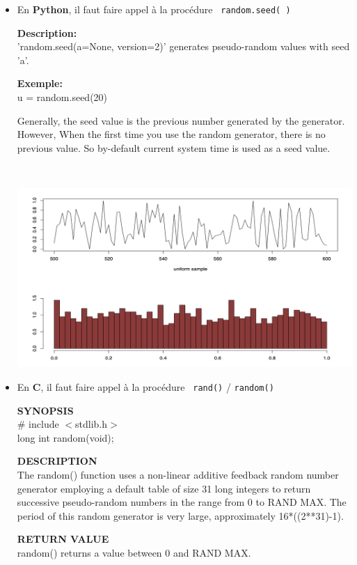 \begin{itemize}
\item En {\bf Python}, il faut faire appel \`a la proc\'edure 
\texttt{ random.seed( )} \\

{\footnotesize 
{\sffamily

{\bfseries Description:}\\
'random.seed(a=None, version=2)' generates pseudo-random values with seed 'a'.

{\bfseries Exemple:}\\
    u = random.seed(20)

Generally, the seed value is the previous number generated by the generator. However, When the first time you use the random generator, there is no previous value. So by-default current system time is used as a seed value.} }\\

\begin{center}
\includegraphics[scale=0.3]{figures/calcul/runif.png}
\end{center}


\item En {\bf C}, il faut faire appel \`a la proc\'edure \texttt{ rand()} / {\tt random()} \\

{\footnotesize 
{\sffamily

{\bfseries SYNOPSIS}\\
       \# include $<$stdlib.h$>$\\
       long int random(void);

{\bfseries DESCRIPTION}\\
The random() function uses a non-linear additive feedback 
random number generator employing a default table of size 
31 long integers to return successive pseudo-random numbers 
in the range from 0 to RAND MAX. The period of this random 
generator is very large, approximately 16*((2**31)-1).

{\bfseries RETURN VALUE}\\
random() returns a value between 0 and RAND MAX.}} \\
\end{itemize}

